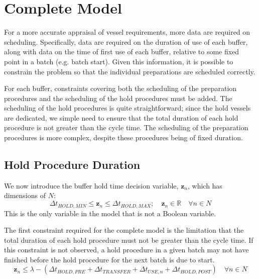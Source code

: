 \section{Complete Model}\label{S.prepsched}

For a more accurate appraisal of vessel requirements, more data are required
on scheduling.
Specifically, data are required on the duration of use of each buffer, along
with data on the time of first use of each buffer, relative to some fixed point
in a batch (e.g. batch start).
Given this information, it is possible to constrain the problem so that the
individual preparations are scheduled correctly.

For each buffer, constraints covering both the scheduling of the preparation
procedures and the scheduling of the hold procedures must be added.
The scheduling of the hold procedures is quite straightforward; since the hold
vessels are dedicated, we simple need to ensure that the total duration of each
hold procedure is not greater than the cycle time.
The scheduling of the preparation procedures is more complex, despite these
procedures being of fixed duration.

\subsection{Hold Procedure Duration}\label{SS.constr5}

We now introduce the buffer hold time decision variable, $\boldsymbol{z}_{n}$,
which has dimensions of $N$:
\begin{equation}
    \Delta t_{\mathit{HOLD,MIN}} \le \boldsymbol{z}_{n} \le 
    \Delta t_{\mathit{HOLD,MAX}}; \quad
    \boldsymbol{z}_{n} \in \mathbb{R} \quad \forall n \in N
    \label{eq.z}
\end{equation}
This is the only variable in the model that is not a Boolean variable.

The first constraint required for the complete model is the limitation that the
total duration of each hold procedure must not be greater than the cycle time.
If this constraint is not observed, a hold procedure in a given batch may not
have finished before the hold procedure for the next batch is due to start.
\begin{equation}
    \boldsymbol{z}_{n} \le \lambda - \left( \Delta t_{\mathit{HOLD,PRE}} +
    \Delta t_{\mathit{TRANSFER}} + \Delta t_{\mathit{USE},n} + \Delta
    t_{\mathit{HOLD,POST}} \right) \quad \forall n \in N
    \label{eq.constr5}
\end{equation}

